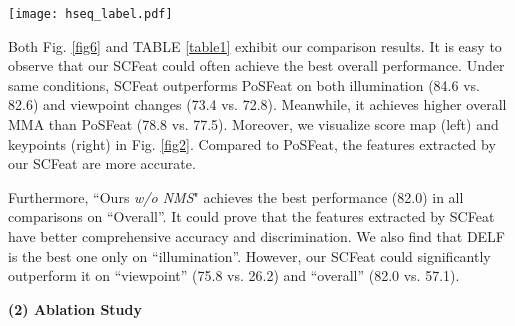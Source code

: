\documentclass[journal]{IEEEtran}
\begin{document}
\begin{figure*}[h]
\centering
\texttt{[image: hseq\_label.pdf]}
\caption{Results achieved on HPatches dataset. Mean matching accuracy (MMA), evaluated at different error thresholds, is illustrated.}
\label{fig6}
\end{figure*}

Both Fig. \ref{fig6} and TABLE \ref{table1} exhibit our comparison results.
It is easy to observe that our SCFeat could often achieve the best overall performance. Under same conditions, SCFeat outperforms PoSFeat on both illumination (84.6 vs. 82.6) and viewpoint changes (73.4 vs. 72.8). Meanwhile, it achieves higher overall MMA than PoSFeat (78.8 vs. 77.5). Moreover, we visualize score map (left) and keypoints (right) in Fig. \ref{fig2}. 
Compared to PoSFeat, the features extracted by our SCFeat are more accurate. 

Furthermore, ``Ours \textit{w/o NMS}" achieves the best performance (82.0) in all comparisons on ``Overall''. It could prove that the features extracted by SCFeat have better comprehensive accuracy and discrimination. We also find that DELF is the best one only on ``illumination''. However, our SCFeat could significantly outperform it on ``viewpoint'' (75.8 vs. 26.2) and ``overall'' (82.0 vs. 57.1).

\textbf{(2) Ablation Study}
\end{document}
